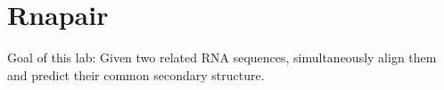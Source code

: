 \chapter{Rnapair}

Goal of this lab:
Given two related RNA sequences, simultaneously align them and predict their common secondary structure.

